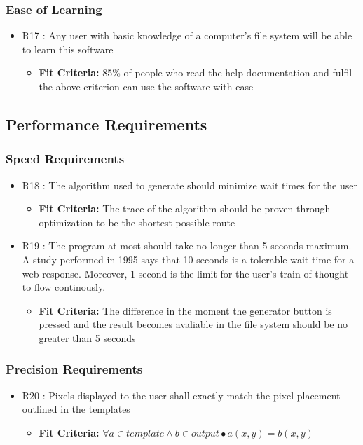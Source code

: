 \documentclass[12pt, titlepage]{article}
\begin{document}
\subsubsection{Ease of Learning}
\begin{itemize}
\item{R17 : Any user with basic knowledge of a computer's file system will be able to learn this software}
\begin{itemize}
\item{\textbf{Fit Criteria:} 85\% of people who read the help documentation and fulfil the above criterion can use the software with ease}
\end{itemize}
\end{itemize}
\subsection{Performance Requirements}
\subsubsection{Speed Requirements}
\begin{itemize}
\item{R18 : The algorithm used to generate should minimize wait times for the user}
\begin{itemize}
\item{\textbf{Fit Criteria:} The trace of the algorithm should be proven through optimization to be the shortest possible route}
\end{itemize}
\item{R19 : The program at most should take no longer than 5 seconds maximum. A study performed in 1995 says that 10 seconds is a tolerable wait time for a web response. Moreover, 1 second is the limit for the user's train of thought to flow continously. \cite{nielsen_1995}}
\begin{itemize}
\item{\textbf{Fit Criteria:} The difference in the moment the generator button is pressed and the result becomes avaliable in the file system should be no greater than 5 seconds}
\end{itemize}
\end{itemize}
\subsubsection{Precision Requirements}
\begin{itemize}
\item{R20 : Pixels displayed to the user shall exactly match the pixel placement outlined in the templates}
\begin{itemize}
\item{\textbf{Fit Criteria:} $\forall a \in template \land b \in output \bullet a(x,y) = b(x,y)$}
\end{itemize}
\end{itemize}
\end{document}
